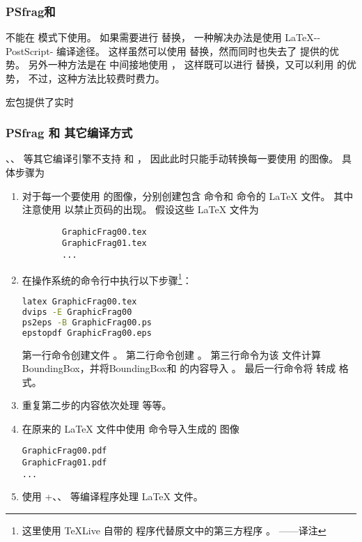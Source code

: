 \subsubsection{PSfrag和 \pdfTeX{}}\label{sssec:psfrag-pdftex}
 不能在 \pdfTeX{} 模式下使用。
如果需要进行  替换，
一种解决办法是使用 \LaTeX{}--PostScript- 编译途径。
这样虽然可以使用  替换，然而同时也失去了 \pdfTeX{} 提供的优势。
另外一种方法是在 \pdfTeX{} 中间接地使用 ，
这样既可以进行  替换，又可以利用 \pdfTeX{} 的优势，
不过，这种方法比较费时费力。

 宏包提供了实时


\subsubsection{PSfrag 和 其它编译方式}\label{sssec:psfrag-otherdriver}
、\XeTeX{}、\LuaTeX{} 等其它编译引擎不支持  和 ，
因此此时只能手动转换每一要使用  的图像。
具体步骤为
\begin{enumerate}
	\item 对于每一个要使用  的图像，分别创建包含  命令和  命令的 \LaTeX{} 文件。
	其中注意使用  以禁止页码的出现。
	假设这些 \LaTeX{} 文件为
\begin{verbatim}
		GraphicFrag00.tex
		GraphicFrag01.tex
		...
\end{verbatim}
	\item 在操作系统的命令行中执行以下步骤\footnote{%
		这里使用 \TeX Live 自带的  程序代替原文中的第三方程序 。
		——译注}：
\begin{lstlisting}[language=bash]
latex GraphicFrag00.tex
dvips -E GraphicFrag00
ps2eps -B GraphicFrag00.ps
epstopdf GraphicFrag00.eps
\end{lstlisting}
	第一行命令创建文件 。
	第二行命令创建 。
	第三行命令为该  文件计算 BoundingBox，并将BoundingBox和  的内容导入 。
	最后一行命令将  转成  格式。
	\item 重复第二步的内容依次处理  等等。
	\item 在原来的 \LaTeX{} 文件中使用  命令导入生成的  图像
\begin{verbatim}
GraphicFrag00.pdf
GraphicFrag01.pdf
...
\end{verbatim}
	\item 使用 +、、 等编译程序处理 \LaTeX{} 文件。
\end{enumerate}


